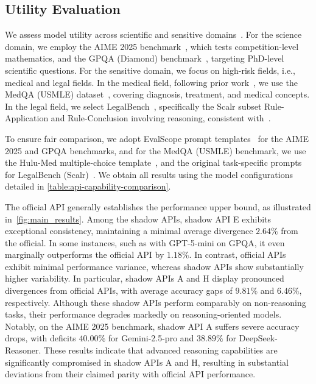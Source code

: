 \documentclass[letterpaper,twocolumn,10pt]{article}
\begin{document}
\subsection{Utility Evaluation}

We assess model utility across scientific and sensitive domains~\cite{T25,D25,T251}.
For the science domain, we employ the AIME 2025 benchmark~\cite{A251}, which tests competition-level mathematics, and the GPQA (Diamond) benchmark~\cite{RHSPPDMB23}, targeting PhD-level scientific questions.
For the sensitive domain, we focus on high-risk fields, i.e., medical and legal fields.
In the medical field, following prior work~\cite{TSSCZXWZWSCG25}, we use the MedQA (USMLE) dataset~\cite{JPOWFS21}, covering diagnosis, treatment, and medical concepts.
In the legal field, we select LegalBench~\cite{GNHRCNCPWRZTHSFSDPHWNNNCTHMLRHKHRGGWGZIL23}, specifically the Scalr subset Rule-Application and Rule-Conclusion involving reasoning, consistent with~\cite{CTXWML25, HYGWKW25}.

To ensure fair comparison, we adopt EvalScope prompt templates~\cite{C25} for the AIME 2025 and GPQA benchmarks, and for the MedQA (USMLE) benchmark, we use the Hulu-Med multiple-choice template~\cite {JWSHZPZYFZHCWTLXWXFZLXSWL25}, and the original task-specific prompts for LegalBench (Scalr)~\cite{GNHRCNCPWRZTHSFSDPHWNNNCTHMLRHKHRGGWGZIL23}.
We obtain all results using the model configurations detailed in \autoref{table:api-capability-comparison}.

The official API generally establishes the performance upper bound, as illustrated in~\autoref{fig:main_results}. 
Among the shadow APIs, shadow API E exhibits exceptional consistency, maintaining a minimal average divergence $2.64\%$ from the official. 
In some instances, such as with GPT-5-mini on GPQA, it even marginally outperforms the official API by $1.18\%$.
In contrast, official APIs exhibit minimal performance variance, whereas shadow APIs show substantially higher variability.
In particular, shadow APIs A and H display pronounced divergences from official APIs, with average accuracy gaps of $9.81\%$ and $6.46\%$, respectively.
Although these shadow APIs perform comparably on non-reasoning tasks, their performance degrades markedly on reasoning-oriented models.
Notably, on the AIME 2025 benchmark, shadow API A suffers severe accuracy drops, with deficits $40.00\%$ for Gemini-2.5-pro and $38.89\%$ for DeepSeek-Reasoner.
These results indicate that advanced reasoning capabilities are significantly compromised in shadow APIs A and H, resulting in substantial deviations from their claimed parity with official API performance.
\end{document}
